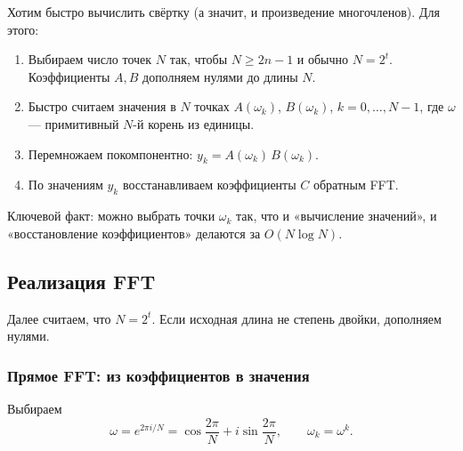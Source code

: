 Хотим быстро вычислить свёртку (а значит, и произведение многочленов).
Для этого:

\begin{enumerate}
	\item Выбираем число точек $N$ так, чтобы $N\ge 2n-1$ и обычно $N=2^t$.
	Коэффициенты $A,B$ дополняем нулями до длины $N$.
	\item Быстро считаем значения в $N$ точках $A(\omega_k)$, $B(\omega_k)$, $k=0,\dots,N-1$,
	где $\omega$ — примитивный $N$-й корень из единицы.
	\item Перемножаем покомпонентно: $y_k = A(\omega_k)\,B(\omega_k)$.
	\item По значениям $y_k$ восстанавливаем коэффициенты $C$ обратным FFT.
\end{enumerate}

Ключевой факт: можно выбрать точки $\omega_k$ так, что и «вычисление значений»,
и «восстановление коэффициентов» делаются за $O(N\log N)$.

\subsection*{Реализация FFT}

Далее считаем, что $N=2^t$. Если исходная длина не степень двойки,
дополняем нулями.

\subsubsection*{Прямое FFT: из коэффициентов в значения}

Выбираем
\[
\omega = e^{2\pi i/N}=\cos\frac{2\pi}{N}+i\sin\frac{2\pi}{N},
\qquad
\omega_k=\omega^k.
\]

